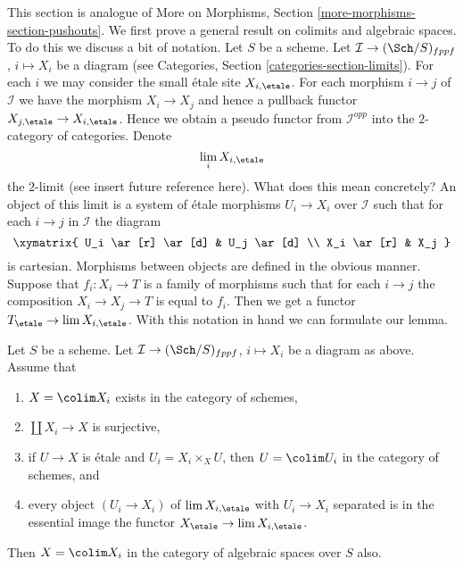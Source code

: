 \noindent
This section is analogue of
More on Morphisms, Section \ref{more-morphisms-section-pushouts}.
We first prove a general result on colimits and algebraic spaces.
To do this we discuss a bit of notation. Let $S$ be a scheme.
Let $\mathcal{I} \to (\Sch/S)_{fppf}$, $i \mapsto X_i$
be a diagram (see Categories, Section \ref{categories-section-limits}).
For each $i$ we may consider the small \'etale site $X_{i, \etale}$.
For each morphism $i \to j$ of $\mathcal{I}$ we have the morphism
$X_i \to X_j$ and hence a pullback functor
$X_{j, \etale} \to X_{i, \etale}$.
Hence we obtain a pseudo functor from $\mathcal{I}^{opp}$ into
the $2$-category of categories. Denote
$$
\lim_i X_{i, \etale}
$$
the $2$-limit (see insert future reference here). What does this mean
concretely? An object of this limit is a system of \'etale morphisms
$U_i \to X_i$ over $\mathcal{I}$ such that for each $i \to j$ in
$\mathcal{I}$ the diagram
$$
\xymatrix{
U_i \ar[r] \ar[d] & U_j \ar[d] \\
X_i \ar[r] & X_j
}
$$
is cartesian. Morphisms between objects are defined in the obvious manner.
Suppose that $f_i : X_i \to T$ is a family of morphisms such that
for each $i \to j$ the composition $X_i \to X_j \to T$ is equal to $f_i$.
Then we get a functor $T_\etale \to \lim X_{i, \etale}$.
With this notation in hand we can formulate our lemma.

\begin{lemma}
\label{lemma-colimit-agrees}
Let $S$ be a scheme. Let $\mathcal{I} \to (\Sch/S)_{fppf}$, $i \mapsto X_i$
be a diagram as above. Assume that
\begin{enumerate}
\item $X = \colim X_i$ exists in the category of schemes,
\item $\coprod X_i \to X$ is surjective,
\item if $U \to X$ is \'etale and $U_i = X_i \times_X U$, then
$U = \colim U_i$ in the category of schemes, and
\item every object $(U_i \to X_i)$ of $\lim X_{i, \etale}$
with $U_i \to X_i$ separated is in the essential image
the functor $X_\etale \to \lim X_{i, \etale}$.
\end{enumerate}
Then $X = \colim X_i$ in the category of algebraic spaces over $S$ also.
\end{lemma}

